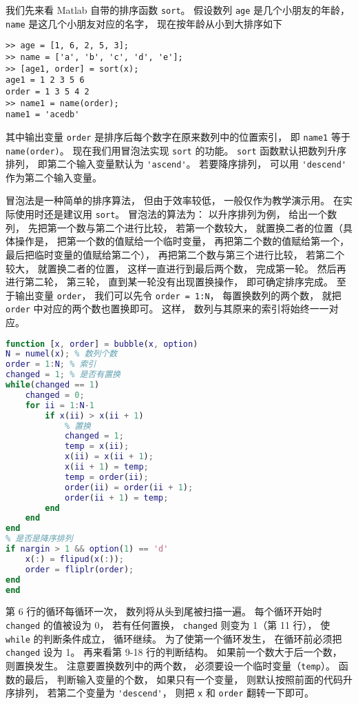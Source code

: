 
我们先来看 Matlab 自带的排序函数 \verb|sort|。 假设数列 \verb|age| 是几个小朋友的年龄， \verb|name| 是这几个小朋友对应的名字， 现在按年龄从小到大排序如下
\begin{lstlisting}[language=matlabC]
>> age = [1, 6, 2, 5, 3];
>> name = ['a', 'b', 'c', 'd', 'e'];
>> [age1, order] = sort(x);
age1 = 1 2 3 5 6
order = 1 3 5 4 2
>> name1 = name(order);
name1 = 'acedb'
\end{lstlisting}
其中输出变量 \verb|order| 是排序后每个数字在原来数列中的位置索引， 即 \verb|name1| 等于 \verb|name(order)|。 现在我们用冒泡法实现 \verb|sort| 的功能。 \verb|sort| 函数默认把数列升序排列， 即第二个输入变量默认为 \verb|'ascend'|。 若要降序排列， 可以用 \verb|'descend'| 作为第二个输入变量。

冒泡法是一种简单的排序算法， 但由于效率较低， 一般仅作为教学演示用。 在实际使用时还是建议用 \verb|sort|。 冒泡法的算法为： 以升序排列为例， 给出一个数列， 先把第一个数与第二个进行比较， 若第一个数较大， 就置换二者的位置（具体操作是， 把第一个数的值赋给一个临时变量， 再把第二个数的值赋给第一个， 最后把临时变量的值赋给第二个）， 再把第二个数与第三个进行比较， 若第二个较大， 就置换二者的位置， 这样一直进行到最后两个数， 完成第一轮。 然后再进行第二轮， 第三轮， 直到某一轮没有出现置换操作， 即可确定排序完成。 至于输出变量 \verb|order|， 我们可以先令 \verb|order = 1:N|， 每置换数列的两个数， 就把 \verb|order| 中对应的两个数也置换即可。 这样， 数列与其原来的索引将始终一一对应。 

\begin{lstlisting}[language=matlab, caption=bubble.m]
% 冒泡法排序
function [x, order] = bubble(x, option)
N = numel(x); % 数列个数
order = 1:N; % 索引
changed = 1; % 是否有置换
while(changed == 1)
    changed = 0;
    for ii = 1:N-1
        if x(ii) > x(ii + 1)
            % 置换
            changed = 1;
            temp = x(ii);
            x(ii) = x(ii + 1);
            x(ii + 1) = temp;
            temp = order(ii);
            order(ii) = order(ii + 1);
            order(ii + 1) = temp;
        end
    end
end
% 是否是降序排列
if nargin > 1 && option(1) == 'd'
    x(:) = flipud(x(:));
    order = fliplr(order);
end
end
\end{lstlisting}

第 6 行的循环每循环一次， 数列将从头到尾被扫描一遍。 每个循环开始时 \verb|changed| 的值被设为 0， 若有任何置换， \verb|changed| 则变为 1（第 11 行）， 使 \verb|while| 的判断条件成立， 循环继续。 为了使第一个循环发生， 在循环前必须把 \verb|changed| 设为 1。 再来看第 9-18 行的判断结构。 如果前一个数大于后一个数， 则置换发生。 注意要置换数列中的两个数， 必须要设一个临时变量（\verb|temp|）。 函数的最后， 判断输入变量的个数， 如果只有一个变量， 则默认按照前面的代码升序排列， 若第二个变量为 \verb|'descend'|， 则把 \verb|x| 和 \verb|order| 翻转一下即可。
